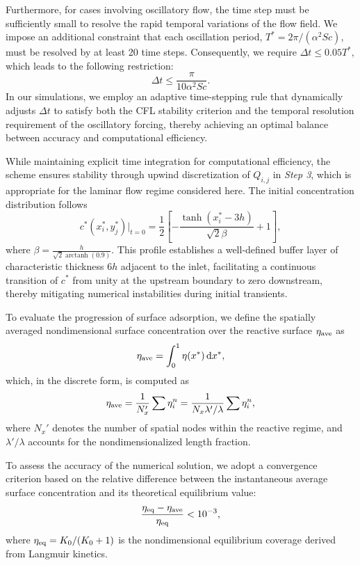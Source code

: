 \documentclass[lineno]{JFM-FLM_Au}
\DeclareMathOperator\arctanh{arctanh}
\begin{document}
{Furthermore, for cases involving oscillatory flow, the time step must be sufficiently small to resolve the rapid temporal variations of the flow field. We impose an additional constraint that each oscillation period, $T^* = 2\pi / (\alpha^2 Sc)$, must be resolved by at least 20 time steps. Consequently, we require $\Delta t \le 0.05 T^*$, which leads to the following restriction:
\begin{equation}
\Delta t \le \frac{\pi}{10 \alpha^2 Sc}.
\label{eq:dt_oscillation}
\end{equation}
In our simulations, we employ an adaptive time-stepping rule that dynamically adjusts $\Delta t$ to satisfy both the CFL stability criterion and the temporal resolution requirement of the oscillatory forcing, thereby achieving an optimal balance between accuracy and computational efficiency.

 
While maintaining explicit time integration for computational efficiency, the scheme ensures stability through upwind discretization of $Q_{i,j}$ in \textit{Step 3}, which is appropriate for the laminar flow regime considered here. The initial concentration distribution follows
\begin{equation}
   c^*(x^*_i,y^*_j)\big|_{t=0}= \frac{1}{2}\left[-\frac{\tanh{(x^*_i - 3h)}}{\sqrt{2}\beta} + 1 \right],
\end{equation}
where $\beta = \frac{h}{\sqrt{2} \arctanh(0.9)}$. This profile establishes a well-defined buffer layer of characteristic thickness $6h$ adjacent to the inlet, facilitating a continuous transition of $c^*$ from unity at the upstream boundary to zero downstream, thereby mitigating numerical instabilities during initial transients.

To evaluate the progression of surface adsorption, we define the spatially averaged nondimensional surface concentration over the reactive surface $\eta_{\rm ave}$ as
\begin{equation}
\eta_{\rm ave} = \int_0^1 \eta(x^*)\,\mathrm{d}x^*,
\end{equation}
which, in the discrete form, is computed as
\begin{equation}
\eta_{\rm ave} = \frac{1}{N_x'} \sum \eta_i^n = \frac{1}{N_x \lambda'/\lambda} \sum \eta_i^n,
\end{equation}
where $N_x'$ denotes the number of spatial nodes within the reactive regime, and $\lambda'/\lambda$ accounts for the nondimensionalized length fraction.

To assess the accuracy of the numerical solution, we adopt a convergence criterion based on the relative difference between the instantaneous average surface concentration and its theoretical equilibrium value:
\begin{equation}
\frac{\eta_{\rm eq} - \eta_{\rm ave}}{\eta_{\rm eq}} < 10^{-3},
\end{equation}
where $\eta_{\rm eq} = K_0 / (K_0 + 1)$ is the nondimensional equilibrium coverage derived from Langmuir kinetics.

}
\end{document}

